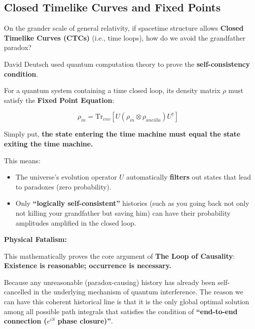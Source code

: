 \subsection{Closed Timelike Curves and Fixed Points}

On the grander scale of general relativity, if spacetime structure allows \textbf{Closed Timelike Curves (CTCs)} (i.e., time loops), how do we avoid the grandfather paradox?

David Deutsch used quantum computation theory to prove the \textbf{self-consistency condition}.

For a quantum system containing a time closed loop, its density matrix $\rho$ must satisfy the \textbf{Fixed Point Equation}:

\[\rho_{in} = \text{Tr}_{env} [ U (\rho_{in} \otimes \rho_{ancilla}) U^\dagger ]\]

Simply put, \textbf{the state entering the time machine must equal the state exiting the time machine.}

This means:

\begin{itemize}
\item The universe's evolution operator $U$ automatically \textbf{filters} out states that lead to paradoxes (zero probability).

\item Only \textbf{``logically self-consistent''} histories (such as you going back not only not killing your grandfather but saving him) can have their probability amplitudes amplified in the closed loop.
\end{itemize}

\textbf{Physical Fatalism:}

This mathematically proves the core argument of \textbf{The Loop of Causality}: \textbf{Existence is reasonable; occurrence is necessary.}

Because any unreasonable (paradox-causing) history has already been self-cancelled in the underlying mechanism of quantum interference. The reason we can have this coherent historical line is that it is the only global optimal solution among all possible path integrals that satisfies the condition of \textbf{``end-to-end connection ($e^{iS}$ phase closure)''}.

